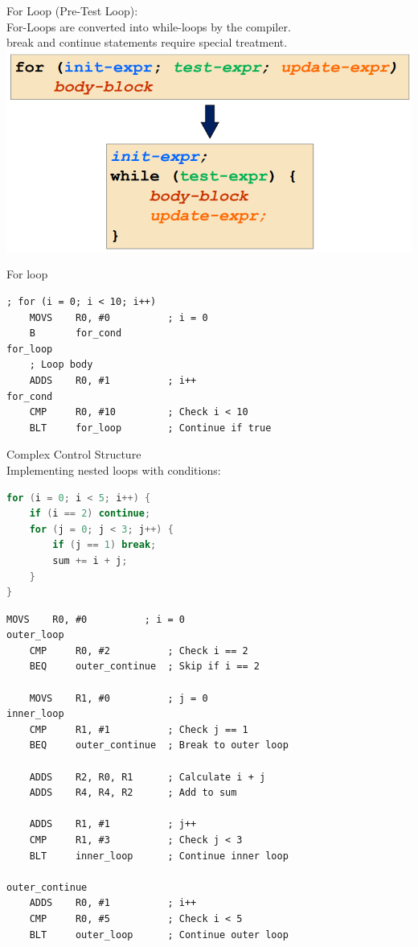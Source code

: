 \begin{concept}{For Loop (Pre-Test Loop)}:\\
For-Loops are converted into while-loops by the compiler.\\
break and continue statements require special treatment.\\
\includegraphics[width=\linewidth]{images/forloop.png}
\end{concept}


\begin{KR}{For loop}
\begin{lstlisting}[language=armasm, style=basesmol]
    ; for (i = 0; i < 10; i++)
    MOVS    R0, #0          ; i = 0
    B       for_cond
for_loop
    ; Loop body
    ADDS    R0, #1          ; i++
for_cond
    CMP     R0, #10         ; Check i < 10
    BLT     for_loop        ; Continue if true
\end{lstlisting}
\end{KR}



\begin{example2}{Complex Control Structure}\\
Implementing nested loops with conditions:

\begin{lstlisting}[language=C, style=basesmol]
for (i = 0; i < 5; i++) {
    if (i == 2) continue;
    for (j = 0; j < 3; j++) {
        if (j == 1) break;
        sum += i + j;
    }
}
\end{lstlisting}
\begin{lstlisting}[language=armasm, style=basesmol]
    MOVS    R0, #0          ; i = 0
outer_loop
    CMP     R0, #2          ; Check i == 2
    BEQ     outer_continue  ; Skip if i == 2
    
    MOVS    R1, #0          ; j = 0
inner_loop
    CMP     R1, #1          ; Check j == 1
    BEQ     outer_continue  ; Break to outer loop
    
    ADDS    R2, R0, R1      ; Calculate i + j
    ADDS    R4, R4, R2      ; Add to sum
    
    ADDS    R1, #1          ; j++
    CMP     R1, #3          ; Check j < 3
    BLT     inner_loop      ; Continue inner loop
    
outer_continue
    ADDS    R0, #1          ; i++
    CMP     R0, #5          ; Check i < 5
    BLT     outer_loop      ; Continue outer loop
\end{lstlisting}
\end{example2}

